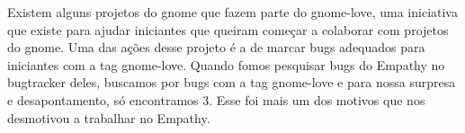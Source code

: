 Existem alguns projetos do gnome que fazem parte do gnome-love, uma iniciativa que existe para ajudar iniciantes que queiram começar a colaborar com projetos do gnome. Uma das ações desse projeto é a de marcar bugs adequados para iniciantes com a tag gnome-love.
Quando fomos pesquisar bugs do Empathy no bugtracker deles, buscamos por bugs com a tag gnome-love e para nossa surpresa e desapontamento, só encontramos 3. Esse foi mais um dos motivos que nos desmotivou a trabalhar no Empathy.
